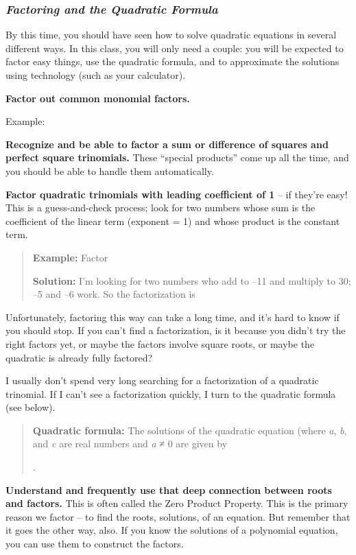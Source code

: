 \subsubsection{\texorpdfstring{\emph{\textbf{Factoring and the Quadratic
Formula}}}{Factoring and the Quadratic Formula}}\label{factoring-and-the-quadratic-formula}

By this time, you should have seen how to solve quadratic equations in
several different ways. In this class, you will only need a couple: you
will be expected to factor easy things, use the quadratic formula, and
to approximate the solutions using technology (such as your calculator).

\textbf{Factor out common monomial factors.}

Example:

\textbf{Recognize and be able to factor a sum or difference of squares
and perfect square trinomials.} These ``special products'' come up all
the time, and you should be able to handle them automatically.

\textbf{Factor quadratic trinomials with leading coefficient of 1} -- if
they're easy! This is a guess-and-check process; look for two numbers
whose sum is the coefficient of the linear term (exponent = 1) and whose
product is the constant term.

\begin{quote}
\textbf{Example:} Factor

\textbf{Solution:} I'm looking for two numbers who add to --11 and
multiply to 30; --5 and --6 work. So the factorization is
\end{quote}

Unfortunately, factoring this way can take a long time, and it's hard to
know if you should stop. If you can't find a factorization, is it
because you didn't try the right factors yet, or maybe the factors
involve square roots, or maybe the quadratic is already fully factored?

I usually don't spend very long searching for a factorization of a
quadratic trinomial. If I can't see a factorization quickly, I turn to
the quadratic formula (see below).

\begin{quote}
\textbf{Quadratic formula:} The solutions of the quadratic equation
(where \emph{a}, \emph{b}, and \emph{c} are real numbers and \emph{a} ≠
0 are given by

.
\end{quote}

\textbf{Understand and frequently use that deep connection between roots
and factors.} This is often called the Zero Product Property. This is
the primary reason we factor -- to find the roots, solutions, of an
equation. But remember that it goes the other way, also. If you know the
solutions of a polynomial equation, you can use them to construct the
factors.

